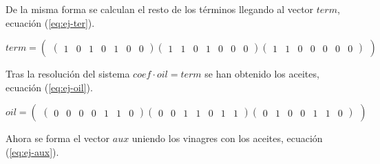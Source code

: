 De la misma forma se calculan el resto de los términos llegando al vector $term$, ecuación (\ref{eq:ej-ter}).

\begin{equation}\label{eq:ej-ter}
	{term} = 
		\left(\begin{matrix}
			\left(\begin{smallmatrix}1 & 0 & 1 & 0 & 1 & 0 & 0\end{smallmatrix}\right)			
			\left(\begin{smallmatrix}1 & 1 & 0 & 1 & 0 & 0 & 0\end{smallmatrix}\right)
			\left(\begin{smallmatrix}1 & 1 & 0 & 0 & 0 & 0 & 0\end{smallmatrix}\right)
		\end{matrix}\right)
\end{equation}

Tras la resolución del sistema $coef \cdot oil = term$ se han obtenido los aceites, ecuación (\ref{eq:ej-oil}).

\begin{equation}\label{eq:ej-oil}
	{oil} = 
		\left(\begin{matrix}
			\left(\begin{smallmatrix}0 & 0 & 0 & 0 & 1 & 1 & 0\end{smallmatrix}\right)			
			\left(\begin{smallmatrix}0 & 0 & 1 & 1 & 0 & 1 & 1\end{smallmatrix}\right)
			\left(\begin{smallmatrix}0 & 1 & 0 & 0 & 1 & 1 & 0\end{smallmatrix}\right)
		\end{matrix}\right)
\end{equation}

Ahora se forma el vector $aux$ uniendo los vinagres con los aceites, ecuación (\ref{eq:ej-aux}).

